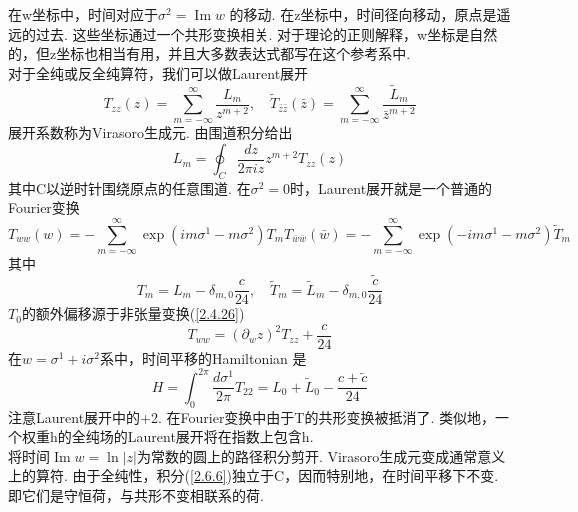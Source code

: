 在w坐标中，时间对应于$\sigma^{2}=\operatorname{Im} w$ 的移动. 在z坐标中，时间径向移动，原点是遥远的过去. 这些坐标通过一个共形变换相关. 对于理论的正则解释，w坐标是自然的，但z坐标也相当有用，并且大多数表达式都写在这个参考系中.\\
对于全纯或反全纯算符，我们可以做Laurent展开
\begin{equation}
T_{z z}(z)=\sum_{m=-\infty}^{\infty} \frac{L_{m}}{z^{m+2}}, \quad \tilde{T}_{\bar{z} \bar{z}}(\bar{z})=\sum_{m=-\infty}^{\infty} \frac{\tilde{L}_{m}}{\bar{z}^{m+2}}
\end{equation}
展开系数称为Virasoro生成元. 由围道积分给出
\begin{equation}\label{2.6.6}
L_{m}=\oint_{C} \frac{d z}{2 \pi i z} z^{m+2} T_{z z}(z)
\end{equation}
其中C以逆时针围绕原点的任意围道. 在$\sigma^2=0$时，Laurent展开就是一个普通的Fourier变换
\begin{subequations}
\begin{equation}
T_{w w}(w)=-\sum_{m=-\infty}^{\infty} \exp \left(i m \sigma^{1}-m \sigma^{2}\right) T_{m}
\end{equation}
\begin{equation}
T_{\bar{w} \bar{w}}(\bar{w})=-\sum_{m=-\infty}^{\infty} \exp \left(-i m \sigma^{1}-m \sigma^{2}\right) \tilde{T}_{m}
\end{equation}
\end{subequations}
其中
\begin{equation}\label{2.6.8}
T_{m}=L_{m}-\delta_{m, 0} \frac{c}{24}, \quad \tilde{T}_{m}=\tilde{L}_{m}-\delta_{m, 0} \frac{\tilde{c}}{24}
\end{equation}
$T_0$的额外偏移源于非张量变换(\ref{2.4.26})
\begin{equation}
T_{w w}=\left(\partial_{w} z\right)^{2} T_{z z}+\frac{c}{24}
\end{equation}
在$w=\sigma^{1}+i \sigma^{2}$系中，时间平移的Hamiltonian 是
\begin{equation}\label{2.6.10}
H=\int_{0}^{2 \pi} \frac{d \sigma^{1}}{2 \pi} T_{22}=L_{0}+\tilde{L}_{0}-\frac{c+\tilde{c}}{24}
\end{equation}
注意Laurent展开中的+2. 在Fourier变换中由于T的共形变换被抵消了. 类似地，一个权重h的全纯场的Laurent展开将在指数上包含h. \\
将时间$\operatorname{Im} w=\ln |z|$为常数的圆上的路径积分剪开. Virasoro生成元变成通常意义上的算符. 由于全纯性，积分(\ref*{2.6.6})独立于C，因而特别地，在时间平移下不变. 即它们是守恒荷，与共形不变相联系的荷. \\

